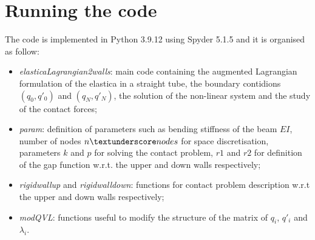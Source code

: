 \section*{Running the code}

The code is implemented in Python 3.9.12 using Spyder 5.1.5 and it is organised as follow: \begin{itemize}
	\item \textit{elastica\textunderscore Lagrangian\textunderscore 2walls}: main code containing the augmented Lagrangian formulation of the elastica in a straight tube, the boundary contidions $(q_0,q'_0)$ and $(q_N, q'_N)$, the solution of the non-linear system and the study of the contact forces;
	\item \textit{param}: definition of parameters such as bending stiffness of the beam $EI$, number of nodes $n\textunderscore nodes$ for space discretisation, parameters $k$ and $p$ for solving the contact problem, $r1$ and $r2$ for definition of the gap function w.r.t. the upper and down walls respectively;
	\item \textit{rigid\textunderscore wall\textunderscore up} and \textit{rigid\textunderscore wall\textunderscore down}: functions for contact problem description w.r.t the upper and down walls respectively;
	\item \textit{mod\textunderscore QVL}: functions useful to modify the structure of the matrix of $q_i$, $q'_i$ and $\lambda_i$.  
\end{itemize}



